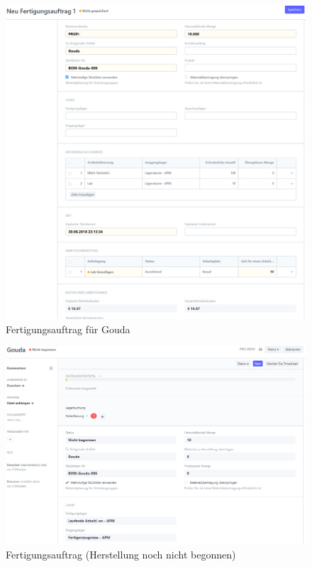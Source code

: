 \begin{figure}[H]
  \centering
  \includegraphics[width=\textwidth]{Bilder/Fertigungsauftrag.PNG}
  \caption{Fertigungsauftrag für Gouda}
  \label{fig:fertAuftr}
\end{figure}
\begin{figure}[H]
  \centering
  \includegraphics[width=\textwidth]{Bilder/Fertigungsauftrag_nicht_begonnen.PNG}
  \caption{Fertigungsauftrag (Herstellung noch nicht begonnen)}
  \label{fig:fertNichtBeg}
\end{figure}
